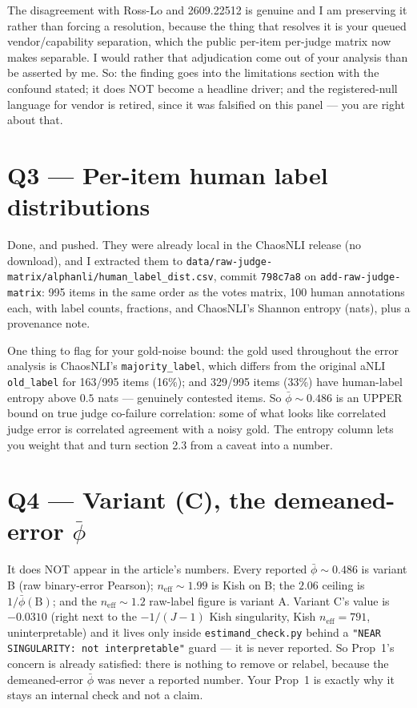 \documentclass[11pt]{article}
\begin{document}
The disagreement with Ross-Lo and 2609.22512 is genuine and I am preserving it rather than forcing a resolution, because the thing that resolves it is your queued vendor/capability separation, which the public per-item per-judge matrix now makes separable. I would rather that adjudication come out of your analysis than be asserted by me. So: the finding goes into the limitations section with the confound stated; it does NOT become a headline driver; and the registered-null language for vendor is retired, since it was falsified on this panel --- you are right about that.

\section*{Q3 --- Per-item human label distributions}

Done, and pushed. They were already local in the ChaosNLI release (no download), and I extracted them to \texttt{data/raw-judge-matrix/alphanli/human\_label\_dist.csv}, commit \texttt{798c7a8} on \texttt{add-raw-judge-matrix}: 995 items in the same order as the votes matrix, 100 human annotations each, with label counts, fractions, and ChaosNLI's Shannon entropy (nats), plus a provenance note.

One thing to flag for your gold-noise bound: the gold used throughout the error analysis is ChaosNLI's \texttt{majority\_label}, which differs from the original aNLI \texttt{old\_label} for 163/995 items (16\%); and 329/995 items (33\%) have human-label entropy above $0.5$ nats --- genuinely contested items. So $\bar\phi \sim 0.486$ is an UPPER bound on true judge co-failure correlation: some of what looks like correlated judge error is correlated agreement with a noisy gold. The entropy column lets you weight that and turn section 2.3 from a caveat into a number.

\section*{Q4 --- Variant (C), the demeaned-error $\bar\phi$}

It does NOT appear in the article's numbers. Every reported $\bar\phi \sim 0.486$ is variant B (raw binary-error Pearson); $n_{\mathrm{eff}} \sim 1.99$ is Kish on B; the $2.06$ ceiling is $1/\bar\phi(\mathrm{B})$; and the $n_{\mathrm{eff}} \sim 1.2$ raw-label figure is variant A. Variant C's value is $-0.0310$ (right next to the $-1/(J-1)$ Kish singularity, Kish $n_{\mathrm{eff}} = 791$, uninterpretable) and it lives only inside \texttt{estimand\_check.py} behind a \texttt{"NEAR SINGULARITY: not interpretable"} guard --- it is never reported. So Prop~1's concern is already satisfied: there is nothing to remove or relabel, because the demeaned-error $\bar\phi$ was never a reported number. Your Prop~1 is exactly why it stays an internal check and not a claim.
\end{document}
